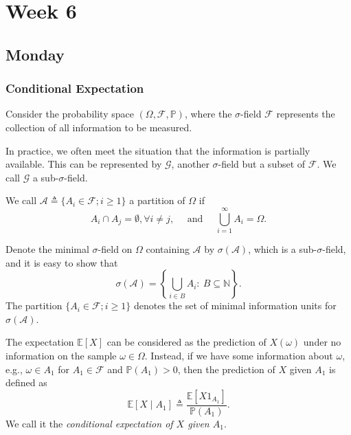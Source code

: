
\chapter{Week 6}

\section{Monday}

\subsection{Conditional Expectation}

Consider the probability space $(\Omega,\mathcal{F},\mathbb{P})$,
where the $\sigma$-field $\mathcal{F}$ represents the collection of all information
to be measured.

In practice, we often meet the situation that the information is partially available.
This can be represented by $\mathcal{G}$, another $\sigma$-field but a subset of $\mathcal{F}$.
We call $\mathcal{G}$ a sub-$\sigma$-field.

\begin{definition}[Partition]
We call $\mathcal{A}\triangleq\{A_i\in\mathcal{F}; i\ge1\}$ a partition of $\Omega$ if
\[
A_i\cap A_j=\emptyset, \forall i\ne j,\quad
\text{ and }\quad \bigcup_{i=1}^\infty A_i=\Omega.
\]
\end{definition}
Denote the minimal $\sigma$-field on $\Omega$ containing $\mathcal{A}$ by $\sigma(\mathcal{A})$,
which is a sub-$\sigma$-field, and it is easy to show that 
\[
\sigma(\mathcal{A}) = \left\{
\bigcup_{i\in B}A_i:~B\subseteq\mathbb{N}
\right\}.
\]
The partition $\{A_i\in\mathcal{F}; i\ge1\}$ denotes the set of minimal information units for $\sigma(\mathcal{A})$.

The expectation $\mathbb{E}[X]$ can be considered as the prediction of $X(\omega)$ under no information on the sample $\omega\in\Omega$.
Instead, if we have some information about $\omega$, e.g., $\omega\in A_1$ for $A_1\in\mathcal{F}$ and $\mathbb{P}(A_1)>0$,
then the prediction of $X$ given $A_1$ is defined as
\[
\mathbb{E}[X\mid A_1]\triangleq \frac{\mathbb{E}[X1_{A_1}]}{\mathbb{P}(A_1)}.
\]
We call it the \emph{conditional expectation of $X$ given $A_1$}.

